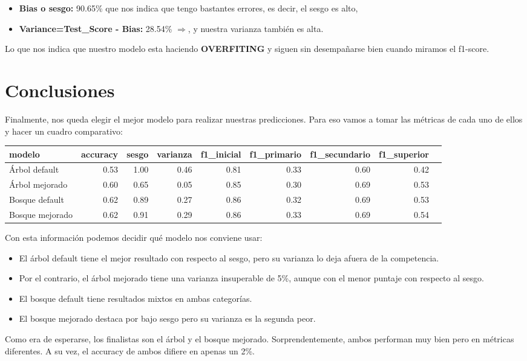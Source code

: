 \documentclass[a4paper]{article}
\begin{document}
            \begin{itemize}
                \item \textbf{Bias o sesgo:} 90.65\% que nos indica que tengo bastantes errores, es decir, el sesgo es alto,
                \item \textbf{Variance=Test\_Score - Bias:} 28.54\% $\Rightarrow$, y nuestra varianza también es alta. 
            \end{itemize} 

            Lo que nos indica que nuestro modelo esta haciendo \textbf{OVERFITING} y siguen sin desempañarse bien cuando miramos el f1-score.

\newpage

\section{Conclusiones}

    Finalmente, nos queda elegir el mejor modelo para realizar nuestras predicciones. Para eso vamos a tomar las métricas de cada uno de ellos y hacer un cuadro comparativo:
    
    \begin{table}[H]
        \centering
        \begin{tabular}{|l|r|r|r|r|r|r|r|r|}
            \hline
            modelo & accuracy & sesgo & varianza & f1\_inicial & f1\_primario & f1\_secundario & f1\_superior \\ \hline
            Árbol default & 0.53 & 1.00 & 0.46 & 0.81 & 0.33 & 0.60 & 0.42 \\ \hline
            Árbol mejorado & 0.60 & 0.65 & 0.05 & 0.85 & 0.30 & 0.69 & 0.53 \\ \hline
            Bosque default & 0.62 & 0.89 & 0.27 & 0.86 & 0.32 & 0.69 & 0.53 \\ \hline
            Bosque mejorado & 0.62 & 0.91 & 0.29 & 0.86 & 0.33 & 0.69 & 0.54 \\ \hline
        \end{tabular}
    \end{table}

    Con esta información podemos decidir qué modelo nos conviene usar:
    \begin{itemize}
        \item El árbol default tiene el mejor resultado con respecto al sesgo, pero su varianza lo deja afuera de la competencia.
        \item Por el contrario, el árbol mejorado tiene una varianza insuperable de 5\%, aunque con el menor puntaje con respecto al sesgo.
        \item El bosque default tiene resultados mixtos en ambas categorías.
        \item El bosque mejorado destaca por bajo sesgo pero su varianza es la segunda peor.
    \end{itemize}
    Como era de esperarse, los finalistas son el árbol y el bosque mejorado. Sorprendentemente, ambos performan muy bien pero en métricas diferentes. A su vez, el accuracy de ambos difiere en apenas un 2\%.
\end{document}
